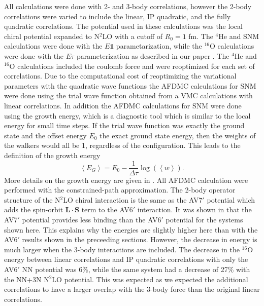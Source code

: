 All calculations were done with 2- and 3-body correlations, however the 2-body correlations were varied to include the linear, IP quadratic, and the fully quadratic correlations. The potential used in these calculations was the local chiral potential expanded to N$^2$LO with a cutoff of $R_0=1$ fm. The $^4$He and SNM calculations were done with the $E\mathbb{1}$ parametarization, while the $^{16}$O calculations were done with the $E\tau$ parameterization as described in our paper \cite{lonardoni2018}. The $^4$He and $^{16}$O calculations included the coulomb force and were reoptimized for each set of correlations. Due to the computational cost of reoptimizing the variational parameters with the quadratic wave functions the AFDMC calculations for SNM were done using the trial wave function obtained from a VMC calculations with linear correlations. In addition the AFDMC calculations for SNM were done using the growth energy, which is a diagnostic tool which is similar to the local energy for small time steps. If the trial wave function was exactly the ground state and the offset energy $E_0$ the exact ground state energy, then the weights of the walkers would all be 1, regardless of the configuration. This leads to the definition of the growth energy
\begin{equation}
\left<E_G\right> = E_0-\frac{1}{\Delta\tau}\log{(\left<w\right>)}.
\end{equation}
More details on the growth energy are given in \cite{lynn2013}. All AFDMC calculation were performed with the constrained-path approximation. The 2-body operator structure of the N$^2$LO chiral interaction is the same as the AV7$'$ potential which adds the spin-orbit $\mathbf{L}\cdot\mathbf{S}$ term to the AV6$'$ interaction. It was shown in \cite{gandolfi2014} that the AV7$'$ potential provides less binding than the AV6$'$ potential for the systems shown here. This explains why the energies are slightly higher here than with the AV6$'$ results shown in the preceeding sections. However, the decrease in energy is much larger when the 3-body interactions are included. The decrease in the $^{16}$O energy between linear correlations and IP quadratic correlations with only the AV6$'$ NN potential was 6\%, while the same system had a decrease of 27\% with the NN+3N N$^2$LO potential. This was expected as we expected the additional correlations to have a larger overlap with the 3-body force than the original linear correlations.

